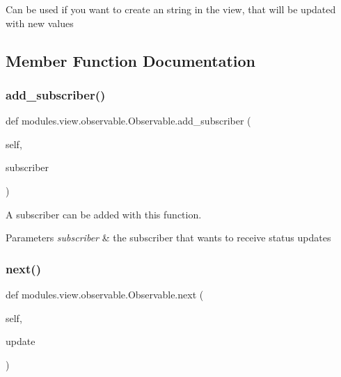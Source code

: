 Can be used if you want to create an string in the view, that will be updated with new values 

\subsection{Member Function Documentation}
\mbox{\label{classmodules_1_1view_1_1observable_1_1_observable_a1560584bfd33f7aac04c288723785264}} 
\subsubsection{\texorpdfstring{add\+\_\+subscriber()}{add\_subscriber()}}
{\footnotesize\ttfamily def modules.\+view.\+observable.\+Observable.\+add\+\_\+subscriber (\begin{DoxyParamCaption}\item[{}]{self,  }\item[{}]{subscriber }\end{DoxyParamCaption})}



A subscriber can be added with this function. 


\begin{DoxyParams}{Parameters}
{\em subscriber} & the subscriber that wants to receive status updates \\
\hline
\end{DoxyParams}
\mbox{\label{classmodules_1_1view_1_1observable_1_1_observable_a148631fbe8f3f1cf66dff03322a48882}} 
\subsubsection{\texorpdfstring{next()}{next()}}
{\footnotesize\ttfamily def modules.\+view.\+observable.\+Observable.\+next (\begin{DoxyParamCaption}\item[{}]{self,  }\item[{}]{update }\end{DoxyParamCaption})}



